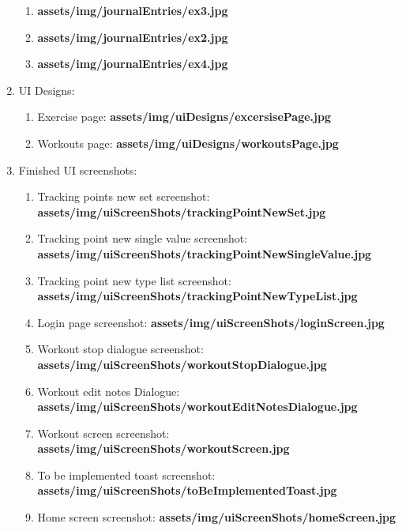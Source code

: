 \documentclass{article}
\begin{document}
\begin{multicols}{2}
\begin{enumerate}
\begin{enumerate}
      \item \textbf{assets/img/journalEntries/ex3.jpg}\\
      \item \textbf{assets/img/journalEntries/ex2.jpg}\\ 
      \item \textbf{assets/img/journalEntries/ex4.jpg}\\ 
    \end{enumerate}
  \item UI Designs:
    \begin{enumerate}
      \item Exercise page: \textbf{assets/img/uiDesigns/excersisePage.jpg}\\
      \item Workouts page: \textbf{assets/img/uiDesigns/workoutsPage.jpg}\\ 
    \end{enumerate}
  \item Finished UI screenshots:
    \begin{enumerate} 
      \item Tracking points new set screenshot: \textbf{assets/img/uiScreenShots/trackingPointNewSet.jpg}\\
      \item Tracking point new single value screenshot: \textbf{assets/img/uiScreenShots/trackingPointNewSingleValue.jpg}\\
      \item Tracking point new type list screenshot: \textbf{assets/img/uiScreenShots/trackingPointNewTypeList.jpg}\\
      \item Login page screenshot: \textbf{assets/img/uiScreenShots/loginScreen.jpg}\\ 
      \item Workout stop dialogue screenshot: \textbf{assets/img/uiScreenShots/workoutStopDialogue.jpg}\\
      \item Workout edit notes Dialogue: \textbf{assets/img/uiScreenShots/workoutEditNotesDialogue.jpg}\\ 
      \item Workout screen screenshot: \textbf{assets/img/uiScreenShots/workoutScreen.jpg}\\
      \item To be implemented toast screenshot: \textbf{assets/img/uiScreenShots/toBeImplementedToast.jpg}\\
      \item Home screen screenshot: \textbf{assets/img/uiScreenShots/homeScreen.jpg}\\ 

\end{enumerate}
\end{enumerate}
\end{multicols}
\end{document}

